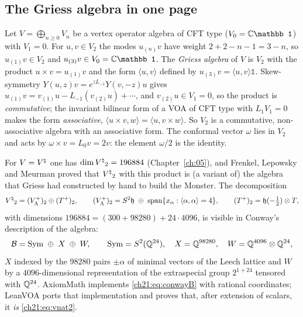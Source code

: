 \subsection{The Griess algebra in one page}

Let $V=\bigoplus_{n\ge0}V_n$ be a vertex operator algebra of CFT type ($V_0=\C\mathbb 1$) with
$V_1=0$.  For $u,v\in V_2$ the modes $u_{(n)}v$ have weight $2+2-n-1=3-n$, so $u_{(1)}v\in V_2$ and
$u_{(3)}v\in V_0=\C\mathbb1$.  The \emph{Griess algebra} of $V$ is $V_2$ with the product
$u\times v=u_{(1)}v$ and the form $\langle u,v\rangle$ defined by $u_{(3)}v=\langle u,v\rangle\mathbb1$.
Skew-symmetry $Y(u,z)v=e^{zL_{-1}}Y(v,-z)u$ gives
$u_{(1)}v=v_{(1)}u-L_{-1}(v_{(2)}u)+\cdots$, and $v_{(2)}u\in V_1=0$, so the product is
\emph{commutative}; the invariant bilinear form of a VOA of CFT type with $L_1V_1=0$ makes the form
\emph{associative}, $\langle u\times v,w\rangle=\langle u,v\times w\rangle$.  So $V_2$ is a
commutative, non-associative algebra with an associative form.  The conformal vector $\omega$ lies
in $V_2$ and acts by $\omega\times v=L_0v=2v$: the element $\omega/2$ is the identity.

For $V={V^{\natural}}$ one has $\dim{V^{\natural}}_2=196884$ (Chapter~\ref{ch:05}), and Frenkel, Lepowsky and Meurman
proved that ${V^{\natural}}_2$ with this product is (a variant of) the algebra that Griess had constructed by
hand to build the Monster.  The decomposition
\begin{equation}\label{ch21:eq:vnat2}
  {V^{\natural}}_2=(V_{\Lambda}^+)_2\oplus(T^+)_2,\qquad
  (V_{\Lambda}^+)_2=S^2\mathfrak h\;\oplus\;\operatorname{span}\{x_\alpha:\langle\alpha,\alpha\rangle=4\},\qquad
  (T^+)_2=\mathfrak h(-\tfrac12)\otimes T,
\end{equation}
with dimensions $196884=(300+98280)+24\cdot4096$, is visible in Conway's description of the algebra:
\begin{equation}\label{ch21:eq:conwayB}
  \mathcal{B}=\mathrm{Sym}\;\oplus\;X\;\oplus\;W,\qquad
  \mathrm{Sym}=S^2({\mathbb{Q}}^{24}),\quad X={\mathbb{Q}}^{98280},\quad W={\mathbb{Q}}^{4096}\otimes{\mathbb{Q}}^{24},
\end{equation}
$X$ indexed by the $98280$ pairs $\pm\alpha$ of minimal vectors of the Leech lattice and $W$ by a
$4096$-dimensional representation of the extraspecial group $2^{1+24}$ tensored with ${\mathbb{Q}}^{24}$.
AxiomMath implements \eqref{ch21:eq:conwayB} with rational coordinates; LeanVOA ports that
implementation and proves that, after extension of scalars, it \emph{is} \eqref{ch21:eq:vnat2}.

